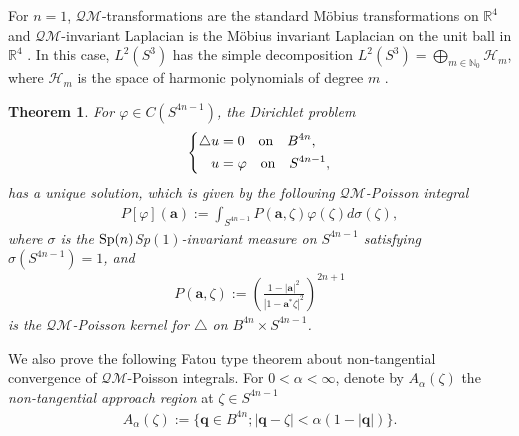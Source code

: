 \documentclass[a4paper,11pt]{amsart}
\numberwithin{equation}{section}
\newtheorem{thm}{Theorem}[section]
\begin{document}
For $n=1$, $\mathcal{QM}$-transformations are the standard M\"{o}bius transformations on $\mathbb{R}^{4}$ and $\mathcal{QM}$-invariant Laplacian is the M\"{o}bius invariant Laplacian on the unit ball in $\mathbb{R}^{4}$ \cite{Stoll}. In this case, $L^2(S^{3})$ has the simple decomposition $L^2(S^{3})=\mathop{\bigoplus}\limits_{m\in \mathbb{N}_0}\mathcal{H}_{m}$, where $\mathcal{H}_{m}$ is the space of harmonic polynomials of degree $m$ \cite[Theorem 6.1.1]{Stoll}.



\begin{thm}\label{posson}
For $\varphi\in C(S^{4n-1})$, the Dirichlet problem
\begin{equation}\begin{aligned}\label{Dirichlet p}
\left\{
\begin{aligned}
 \triangle u&=0 {\rm\quad on}\quad B^{4n},\\
u&=\varphi {\rm \quad on}\quad S^{4n-1},
\end{aligned}
\right.
\end{aligned}\end{equation}
has a unique solution, which is given by the following $\mathcal{QM}$-Poisson integral
\begin{equation}\begin{aligned}\label{def poisson int}
P[\varphi](\mathbf{a}):=\int_{S^{4n-1}} P(\mathbf{a},\zeta)\varphi(\zeta)d\sigma(\zeta),
\end{aligned}\end{equation}
 where $\sigma$ is the ${\rm Sp}(n)$Sp$(1)$-invariant measure on $S^{4n-1}$ satisfying $\sigma(S^{4n-1})=1$, and
\begin{equation}\begin{aligned}\label{def poisson k}
P(\mathbf{a},\zeta):=\left(\frac{1-|\mathbf{a}|^2}{|1-\mathbf{a}^*\zeta|^2}\right)^{2n+1}
\end{aligned}\end{equation}
is the $\mathcal{QM}$-Poisson kernel for $\triangle$ on $B^{4n}\times S^{4n-1}$.
\end{thm}
We also prove the following Fatou type theorem about non-tangential convergence of $\mathcal{QM}$-Poisson integrals.
For $0<\alpha<\infty$, denote by $A_{\alpha}(\zeta)$ the \emph{non-tangential approach region} at $\zeta\in S^{4n-1}$
\begin{equation}\begin{aligned}\label{non tan}
A_{\alpha}(\zeta):=\{\mathbf{q}\in B^{4n};|\mathbf{q}-\zeta|<\alpha(1-|\mathbf{q}|)\}.
\end{aligned}\end{equation}
\end{document}
